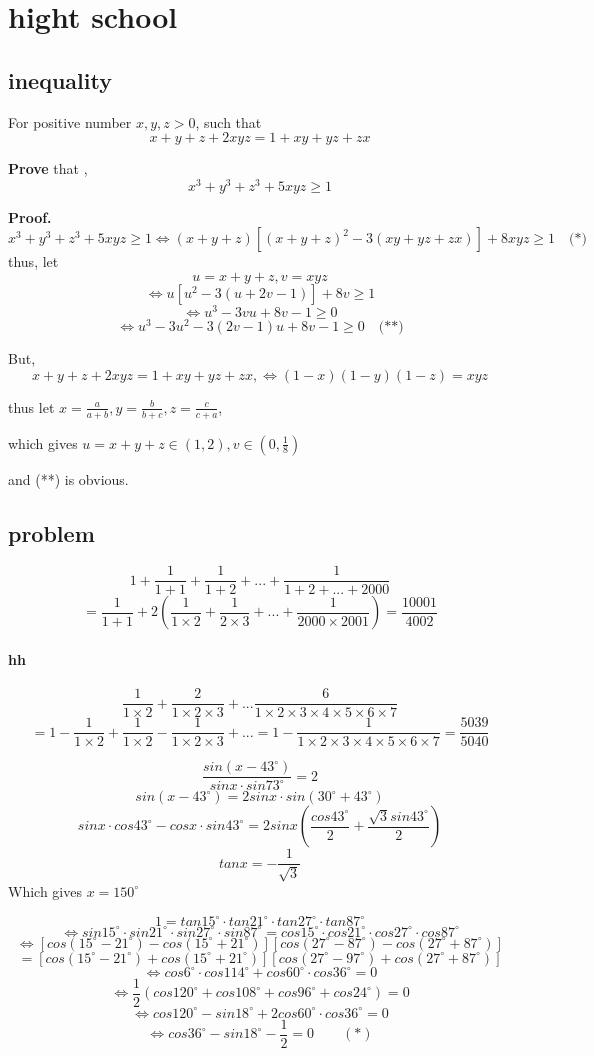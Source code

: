 \documentclass[11pt,a4paper]{article}
\begin{document}
\section{hight school}
\subsection{inequality}
For positive number $x,y,z >0$, such that 
\[ x+y+z+2xyz = 1+xy+yz+zx\]

\textbf{Prove } that ,\[x^3+y^3+z^3+5xyz \ge 1\]

\textbf{Proof.}
$$	x^3+y^3+z^3+5xyz \ge 1 \Longleftrightarrow (x+y+z)[(x+y+z)^2-3(xy+yz+zx)] + 8xyz \ge 1 \quad \textbf{(*)}$$
thus, let $$u=x+y+z, v=xyz$$
$$\Longleftrightarrow u[u^2-3(u+2v-1)] + 8v \ge 1$$
$$\Longleftrightarrow u^3-3vu + 8v-1 \ge 0 $$
$$\Longleftrightarrow u^3-3u^2-3(2v-1)u + 8v-1 \ge 0 \quad \textbf{(**)}$$

But, \[ x+y+z+2xyz = 1+xy+yz+zx, \Longleftrightarrow (1-x)(1-y)(1-z) = xyz\]

thus let $x=\frac{a}{a+b},y=\frac{b}{b+c},z=\frac{c}{c+a}$,

which gives $u=x+y+z\in(1,2), v \in(0,\frac{1}{8})$

and (**) is obvious.

\subsection{problem}
$$1+\frac{1}{1+1}+\frac{1}{1+2}+...+\frac{1}{1+2+...+2000}$$
$$=\frac{1}{1+1}+2(\frac{1}{1\times2}+\frac{1}{2\times3}+...+\frac{1}{2000\times2001})=\frac{10001}{4002}$$
\paragraph{hh}
$$\frac{1}{1\times2}+\frac{2}{1\times2\times3}+...\frac{6}{1\times2\times3\times4\times5\times6\times7}$$
$$=1-\frac{1}{1\times2} + \frac{1}{1\times2}-\frac{1}{1\times2\times3}+...=1-\frac{1}{1\times2\times3\times4\times5\times6\times7}=\frac{5039}{5040}$$

$$\frac{sin(x-43^{\circ})}{sinx\cdot sin73^{\circ}}=2$$
$$sin(x-43^{\circ}) = 2sinx\cdot sin(30^{\circ}+43^{\circ})$$
$$sinx\cdot cos43^{\circ}-cosx\cdot sin43^{\circ}=2sinx(\frac{cos43^{\circ}}{2}+\frac{\sqrt{3}sin43^{\circ}}{2})$$
$$tanx=-\frac{1}{\sqrt{3}}$$
Which gives $x=150^{\circ}$

$$1=tan15^{\circ}\cdot tan21^{\circ}\cdot tan27^{\circ}\cdot tan87^{\circ} $$
$$\Longleftrightarrow sin15^{\circ}\cdot sin21^{\circ}\cdot sin27^{\circ}\cdot sin87^{\circ} = cos15^{\circ}\cdot  cos21^{\circ}\cdot cos27^{\circ}\cdot cos87^{\circ}$$
$$\Longleftrightarrow [cos(15^{\circ}-21^{\circ})-cos(15^{\circ}+21^{\circ})][cos(27^{\circ}-87^{\circ})-cos(27^{\circ}+87^{\circ})]$$
$$=[cos(15^{\circ}-21^{\circ})+cos(15^{\circ}+21^{\circ})][cos(27^{\circ}-97^{\circ})+cos(27^{\circ}+87^{\circ})]$$
$$\Longleftrightarrow cos6^{\circ}\cdot cos114^{\circ} + cos60^{\circ}\cdot cos36^{\circ}=0$$
$$\Longleftrightarrow \frac{1}{2}(cos120^{\circ}+cos108^{\circ}+cos96^{\circ}+cos24^{\circ})=0$$
$$\Longleftrightarrow cos120^{\circ}-sin18^{\circ}+2cos60^{\circ}\cdot cos36^{\circ}=0 $$
$$\Longleftrightarrow cos36^{\circ} - sin18^{\circ} -\frac{1}{2}=0 \quad\quad  (*)$$
\end{document}

